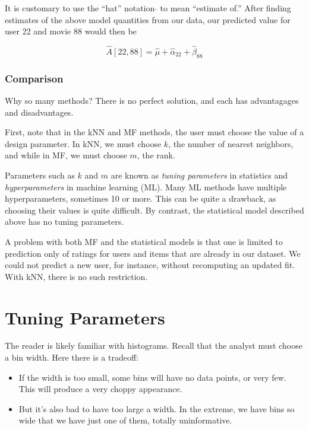 It is customary to use the ``hat'' notation $\widehat{}$ to mean
``estimate of.''  After finding estimates of the above model quantities
from our data, our predicted value for user 22 and movie 88 would then
be

\begin{equation}
\widehat{A}[22,88] = \widehat{\mu} + \widehat{\alpha}_{22} + 
\widehat{\beta}_{88}
\end{equation}

\subsubsection{Comparison}

Why so many methods?  There is no perfect solution, and each has
advantagages and disadvantages.

First, note that in the kNN and MF methods, the user must choose the
value of a design parameter.  In kNN, we must choose $k$, the number of
nearest neighbors, and while in MF, we must choose $m$, the rank.

Parameters such as $k$ and $m$ are known as \textit{tuning parameters}
in statistics and \textit{hyperparameters} in machine learning (ML).
Many ML methods have multiple hyperparameters, sometimes 10 or more.
This can be quite a drawback, as choosing their values is quite
difficult.  By contrast, the statistical model described above has no
tuning parameters.

A problem with both MF and the statistical models is that one is limited
to prediction only of ratings for users and items that are already in
our dataset.  We could not predict a new user, for instance, without
recomputing an updated fit.  With kNN, there is no such restriction.

\section{Tuning Parameters}

The reader is likely familiar with histograms.  Recall that the analyst
must choose a bin width.  Here there is a tradeoff:

\begin{itemize}

\item If the width is too small, some bins will have no data points, or
very few.  This will produce a very choppy appearance.

\item But it's also bad to have too large a width.  In the extreme, we
have bins so wide that we have just one of them, totally uninformative.

\end{itemize} 

